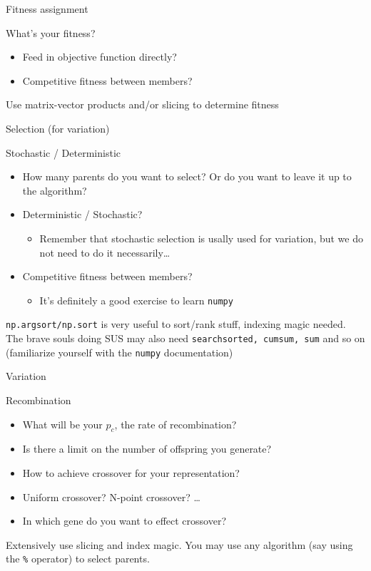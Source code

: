 \documentclass[presentation]{beamer}
\begin{document}
\begin{frame}[label={sec:org209e4d2}]{Fitness assignment}
\begin{block}{What's your fitness?}
\begin{itemize}
\item Feed in objective function directly?
\item Competitive fitness between members?
\end{itemize}
\end{block}
Use matrix-vector products and/or slicing to determine fitness
\end{frame}
\begin{frame}[label={sec:org4cfb15a},fragile]{Selection (for variation)}
 \begin{block}{Stochastic / Deterministic}
\begin{itemize}
\item How many parents do you want to select? Or do you want to leave it up to
the algorithm?
\item Deterministic / Stochastic?
\begin{itemize}
\item Remember that stochastic selection is usally used for variation, but
we do not need to do it necessarily\ldots{}
\end{itemize}
\item Competitive fitness between members?
\begin{itemize}
\item It's definitely a good exercise to learn \texttt{numpy}
\end{itemize}
\end{itemize}
\end{block}
\texttt{np.argsort/np.sort} is very useful to sort/rank stuff, indexing magic
needed. The brave souls doing SUS may also need \texttt{searchsorted, cumsum, sum}
and so on (familiarize yourself with the \texttt{numpy} documentation)
\end{frame}
\begin{frame}[label={sec:org53f9b5f},fragile]{Variation}
 \begin{block}{Recombination}
\begin{itemize}
\item What will be your \(p_c\), the rate of recombination?
\item Is there a limit on the number of offspring you generate?
\item How to achieve crossover for your representation?
\item Uniform crossover? N-point crossover? \ldots{}
\item In which gene do you want to effect crossover?
\end{itemize}
\end{block}
Extensively use slicing and index magic. You may use any algorithm (say
using the \texttt{\%} operator) to select parents.
\end{frame}
\end{document}

